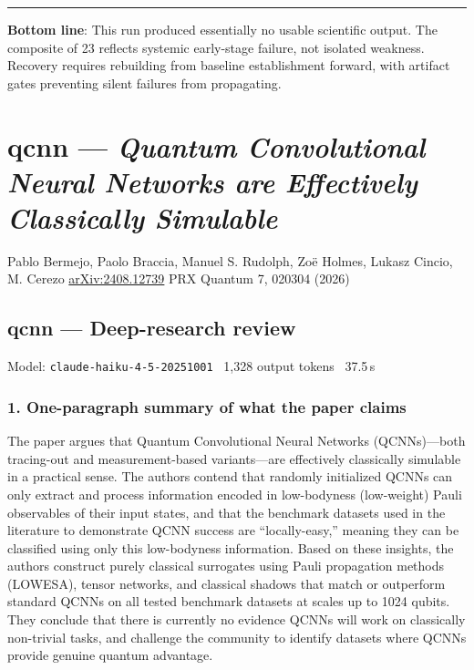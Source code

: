 \documentclass[10pt,letterpaper]{article}
\begin{document}
\begin{center}\rule{0.5\linewidth}{0.5pt}\end{center}

\textbf{Bottom line}: This run produced essentially no usable scientific output. The composite of 23 reflects systemic early-stage failure, not isolated weakness. Recovery requires rebuilding from baseline establishment forward, with artifact gates preventing silent failures from propagating.


\clearpage
\section{qcnn --- \emph{Quantum Convolutional Neural Networks are Effectively Classically Simulable}}
\noindent Pablo Bermejo, Paolo Braccia, Manuel S. Rudolph, Zoë Holmes, Lukasz Cincio, M. Cerezo \quad \href{https://arxiv.org/abs/2408.12739}{arXiv:2408.12739} \quad PRX Quantum 7, 020304 (2026)

\subsection{qcnn --- Deep-research review}
\noindent\textcolor{muted}{\small Model: \texttt{claude-haiku-4-5-20251001} \textperiodcentered\ 1,328 output tokens \textperiodcentered\ 37.5\,s}

\hypertarget{one-paragraph-summary-of-what-the-paper-claims}{%
\subsubsection{1. One-paragraph summary of what the paper claims}\label{one-paragraph-summary-of-what-the-paper-claims}}

The paper argues that Quantum Convolutional Neural Networks (QCNNs)---both tracing-out and measurement-based variants---are effectively classically simulable in a practical sense. The authors contend that randomly initialized QCNNs can only extract and process information encoded in low-bodyness (low-weight) Pauli observables of their input states, and that the benchmark datasets used in the literature to demonstrate QCNN success are ``locally-easy,'' meaning they can be classified using only this low-bodyness information. Based on these insights, the authors construct purely classical surrogates using Pauli propagation methods (LOWESA), tensor networks, and classical shadows that match or outperform standard QCNNs on all tested benchmark datasets at scales up to 1024 qubits. They conclude that there is currently no evidence QCNNs will work on classically non-trivial tasks, and challenge the community to identify datasets where QCNNs provide genuine quantum advantage.
\end{document}
